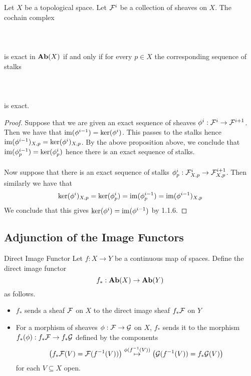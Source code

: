 \documentclass[a4paper]{article}
\begin{document}
\begin{prp}{}{} Let $X$ be a topological space. Let $\mathcal{F}^i$ be a collection of sheaves on $X$. The cochain complex \\~\\
 \\~\\
is exact in $\bold{Ab}(X)$ if and only if for every $p\in X$ the corresponding sequence of stalks \\~\\
 \\~\\
is exact. \tcbline
\begin{proof}
Suppose that we are given an exact sequence of sheaves $\phi^i:\mathcal{F}^i\to\mathcal{F}^{i+1}$. Then we have that $\operatorname{im}(\phi^{i-1})=\ker(\phi^i)$. This passes to the stalks hence $\operatorname{im}(\phi^{i-1})_{X,p}=\ker(\phi^i)_{X,p}$. By the above proposition above, we conclude that $\operatorname{im}(\phi^{i-1}_p)=\ker(\phi^i_p)$ hence there is an exact sequence of stalks. \\~\\

Now suppose that there is an exact sequence of stalks $\phi_p^i:\mathcal{F}_{X,p}^i\to\mathcal{F}_{X,p}^{i+1}$. Then similarly we have that $$\ker(\phi^i)_{X,p}=\ker(\phi_p^i)=\operatorname{im}(\phi_p^{i-1})=\operatorname{im}(\phi^{i-1})_{X,p}$$ We conclude that this gives $\ker(\phi^i)=\operatorname{im}(\phi^{i-1})$ by 1.1.6. 
\end{proof}
\end{prp}

\subsection{Adjunction of the Image Functors}
\begin{defn}{Direct Image Functor}{} Let $f:X\to Y$ be a continuous map of spaces. Define the direct image functor $$f_\ast:\bold{Ab}(X)\to\bold{Ab}(Y)$$ as follows. 
\begin{itemize}
\item $f_\ast$ sends a sheaf $\mathcal{F}$ on $X$ to the direct image sheaf $f_\ast\mathcal{F}$ on $Y$
\item For a morphism of sheaves $\phi:\mathcal{F}\to\mathcal{G}$ on $X$, $f_\ast$ sends it to the morphism $f_\ast(\phi):f_\ast\mathcal{F}\to f_\ast\mathcal{G}$ defined by the components $$\left(f_\ast\mathcal{F}(V)=\mathcal{F}(f^{-1}(V))\right)\overset{\phi(f^{-1}(V))}{\mapsto}\left(\mathcal{G}(f^{-1}(V))=f_\ast\mathcal{G}(V)\right)$$ for each $V\subseteq X$ open. 
\end{itemize}
\end{defn}
\end{document}
